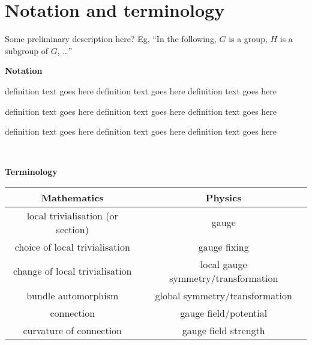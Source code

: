 

\chapter{Notation and terminology}\label{notation}

\renewcommand{\thefootnote}{\fnsymbol{footnote}}



Some preliminary description here?  Eg, ``In the following, $G$ is
a group, $H$ is a subgroup of $G$, \ldots''
\vspace{2em}


\noindent\textbf{Notation}


\newcommand{\nttn}[2]{\item[{\ \makebox[3.18cm][l]{#1}}]{#2}}
\begin{list}{}{ \setlength{\leftmargin}{3.4cm}
                \setlength{\labelwidth}{3.4cm}}

\nttn{notation}{definition text goes here definition text goes
                here definition text goes here}

\nttn{notation}{definition text goes here definition text goes
                here definition text goes here}

\nttn{notation}{definition text goes here definition text goes
                here definition text goes here}

\end{list}

\

\noindent\textbf{Terminology}


\newcommand{\term}[2]{\item[{\ \makebox[4.58cm][l]{#1}}]{#2}}
\begin{table}[htb]
	\centering
	\begin{tabular}{c | c }
		Mathematics & Physics \\
		\hline
		local trivialisation (or section) & gauge \\
		choice of local trivialisation & gauge fixing \\
		change of local trivialisation & local gauge symmetry/transformation\\
		bundle automorphism & global symmetry/transformation\\
		connection & gauge field/potential \\
		curvature of connection & gauge field strength \\
    \end{tabular}
	\label{tab:phys_terminology}
\end{table}

